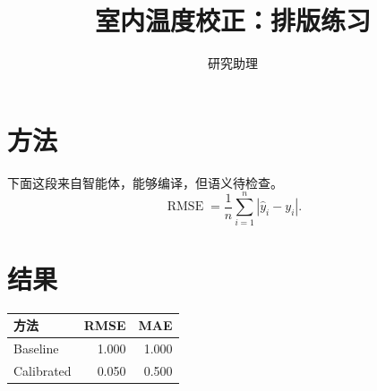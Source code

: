 \documentclass[UTF8,fontset=fandol,a4paper,11pt]{ctexart}
\title{室内温度校正：排版练习}
\author{研究助理}
\date{}
\begin{document}
\maketitle
\section{方法}
下面这段来自智能体，能够编译，但语义待检查。
\begin{equation}
\operatorname{RMSE}=\frac{1}{n}\sum_{i=1}^{n}|\hat y_i-y_i|.
\end{equation}
\section{结果}
\begin{tabular}{|l|r|r|}\hline
方法 & RMSE & MAE\\\hline
Baseline & 1.000 & 1.000\\
Calibrated & 0.050 & 0.500\\\hline
\end{tabular}
\end{document}
